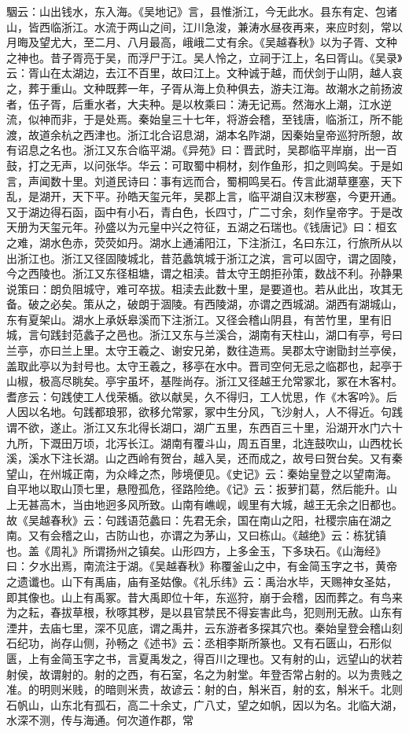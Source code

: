 \documentclass[12pt,UTF8]{ctexbook}
\begin{document}
駰云：山出钱水，东入海。《吴地记》言，县惟浙江，今无此水。县东有定、包诸山，皆西临浙江。水流于两山之间，江川急浚，兼涛水昼夜再来，来应时刻，常以月晦及望尤大，至二月、八月最高，峨峨二丈有余。《吴越春秋》以为子胥、文种之神也。昔子胥亮于吴，而浮尸于江。吴人怜之，立祠于江上，名曰胥山。《吴录》云：胥山在太湖边，去江不百里，故曰江上。文种诚于越，而伏剑于山阴，越人哀之，葬于重山。文种既葬一年，子胥从海上负种俱去，游夫江海。故潮水之前扬波者，伍子胥，后重水者，大夫种。是以枚乘曰：涛无记焉。然海水上潮，江水逆流，似神而非，于是处焉。秦始皇三十七年，将游会稽，至钱唐，临浙江，所不能渡，故道余杭之西津也。浙江北合诏息湖，湖本名阼湖，因秦始皇帝巡狩所憩，故有诏息之名也。浙江又东合临平湖。《异苑》曰：晋武时，吴郡临平岸崩，出一百鼓，打之无声，以问张华。华云：可取蜀中桐材，刻作鱼形，扣之则鸣矣。于是如言，声闻数十里。刘道民诗曰：事有远而合，蜀桐鸣吴石。传言此湖草壅塞，天下乱，是湖开，天下平。孙皓天玺元年，吴郡上言，临平湖自汉末秽塞，今更开通。又于湖边得石函，函中有小石，青白色，长四寸，广二寸余，刻作皇帝字。于是改天册为天玺元年。孙盛以为元皇中兴之符征，五湖之石瑞也。《钱唐记》曰：桓玄之难，湖水色赤，荧荧如丹。湖水上通浦阳江，下注浙江，名曰东江，行旅所从以出浙江也。浙江又径固陵城北，昔范蠡筑城于浙江之滨，言可以固守，谓之固陵，今之西陵也。浙江又东径柤塘，谓之柤渎。昔太守王朗拒孙策，数战不利。孙静果说策曰：朗负阻城守，难可卒拔。柤渎去此数十里，是要道也。若从此出，攻其无备。破之必矣。策从之，破朗于涸陵。有西陵湖，亦谓之西城湖。湖西有湖城山，东有夏架山。湖水上承妖皋溪而下注浙江。又径会稽山阴县，有苦竹里，里有旧城，言句践封范蠡子之邑也。浙江又东与兰溪合，湖南有天柱山，湖口有亭，号曰兰亭，亦曰兰上里。太守王羲之、谢安兄弟，数往造焉。吴郡太守谢勖封兰亭侯，盖取此亭以为封号也。太守王羲之，移亭在水中。晋司空何无忌之临郡也，起亭于山椒，极高尽眺矣。亭宇虽坏，基陛尚存。浙江又径越王允常冢北，冢在木客村。耆彦云：句践使工人伐荣楯。欲以献吴，久不得归，工人忧思，作《木客吟》。后人因以名地。句践都琅邪，欲移允常冢，冢中生分风，飞沙射人，人不得近。句践谓不欲，遂止。浙江又东北得长湖口，湖广五里，东西百三十里，沿湖开水门六十九所，下溉田万顷，北泻长江。湖南有覆斗山，周五百里，北连鼓吹山，山西枕长溪，溪水下注长湖。山之西岭有贺台，越入吴，还而成之，故号曰贺台矣。又有秦望山，在州城正南，为众峰之杰，陟境便见。《史记》云：秦始皇登之以望南海。自平地以取山顶七里，悬隥孤危，径路险绝。《记》云：扳萝扪葛，然后能升。山上无甚高木，当由地迥多风所致。山南有嶕岘，岘里有大城，越王无余之旧都也。故《吴越春秋》云：句践语范蠡曰：先君无余，国在南山之阳，社稷宗庙在湖之南。又有会稽之山，古防山也，亦谓之为茅山，又曰栋山。《越绝》云：栋犹镇也。盖《周礼》所谓扬州之镇矣。山形四方，上多金玉，下多玦石。《山海经》曰：夕水出焉，南流注于湖。《吴越春秋》称覆釜山之中，有金简玉字之书，黄帝之遗谶也。山下有禹庙，庙有圣姑像。《礼乐纬》云：禹治水毕，天赐神女圣姑，即其像也。山上有禹冢。昔大禹即位十年，东巡狩，崩于会稽，因而葬之。有鸟来为之耘，春拔草根，秋啄其秽，是以县官禁民不得妄害此鸟，犯则刑无赦。山东有湮井，去庙七里，深不见底，谓之禹井，云东游者多探其穴也。秦始皇登会稽山刻石纪功，尚存山侧，孙畅之《述书》云：丞相李斯所篆也。又有石匮山，石形似匮，上有金简玉字之书，言夏禹发之，得百川之理也。又有射的山，远望山的状若射侯，故谓射的。射的之西，有石室，名之为射堂。年登否常占射的。以为贵贱之准。的明则米贱，的暗则米贵，故谚云：射的白，斛米百，射的玄，斛米千。北则石帆山，山东北有孤石，高二十余丈，广八丈，望之如帆，因以为名。北临大湖，水深不测，传与海通。何次道作郡，常
\end{document}

